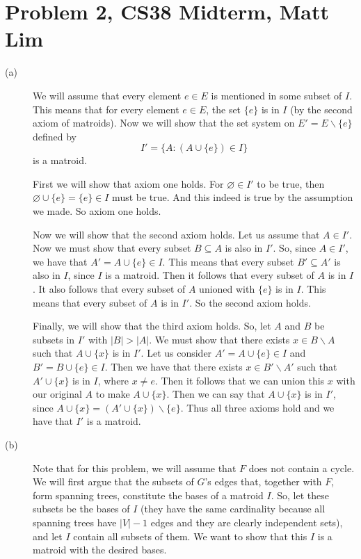 \documentclass{article}
\begin{document}
\section*{Problem 2, CS38 Midterm, Matt Lim}
\begin{description}
    \item[(a)]
        We will assume that every element $e \in E$ is mentioned in some subset
        of $I$. This means that for every element $e \in E$, the set $\{e\}$
        is in $I$ (by the second axiom of matroids). Now we will show that the set system on
        $E' = E \backslash \{e\}$ defined by
        \[ I' = \{A : (A \cup \{e\}) \in I\} \]
        is a matroid.

        First we will show that axiom one holds. For $\varnothing \in I'$ to be
        true, then $\varnothing \cup \{e\} = \{e\} \in I$ must be true. And this
        indeed is true by the assumption we made. So axiom one holds.

        Now we will show that the second axiom holds. Let us assume that $A \in
        I'$. Now we must show that every subset $B \subseteq A$ is also in $I'$.
        So, since $A \in I'$, we have that $A' = A \cup \{e\} \in I$. This means that
        every subset $B' \subseteq A'$ is also in $I$, since $I$ is a matroid.
        Then it follows that every subset of $A$ is in $I$. It also follows that
        every subset of $A$ unioned with $\{e\}$ is in $I$. This means that
        every subset of $A$ is in $I'$. So the second axiom holds.

        Finally, we will show that the third axiom holds. So, let $A$ and $B$ be
        subsets in $I'$ with $|B| > |A|$. We must show that there exists $x \in
        B \backslash A$ such that $A \cup \{x\}$ is in $I'$. Let us consider
        $A' = A \cup \{e\} \in I$ and $B' = B \cup \{e\} \in I$. Then we have
        that there exists $x \in B' \backslash A'$ such that $A' \cup \{x\}$ is
        in $I$, where $x \neq e$. Then it follows that we can union this $x$
        with our original $A$ to make $A \cup \{x\}$. Then we can say that $A
        \cup \{x\}$ is in $I'$, since $A \cup \{x\} = (A' \cup \{x\}) \backslash
        \{e\}$. Thus all three axioms hold and we have that $I'$ is a matroid.
    \item[(b)]
        Note that for this problem, we will assume that $F$ does not
        contain a cycle. We will first argue that the subsets of $G$'s edges that, together with
        $F$, form spanning trees, constitute the bases of a matroid $I$. So, let
        these subsets be the bases of $I$ (they have the same cardinality
        because all spanning trees have $|V| - 1$ edges and they are clearly
        independent sets), and let $I$ contain all subsets of them. We want to
        show that this $I$ is a matroid with the desired bases.


\end{description}
\end{document}
